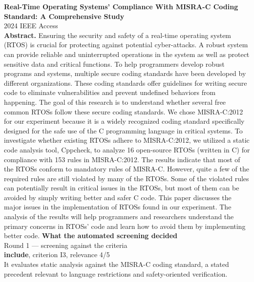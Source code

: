 \documentclass[11pt,a4paper]{article}
\begin{document}
{\large\bfseries Real-Time Operating Systems' Compliance With MISRA-C Coding Standard: A Comprehensive Study}\\[1.5mm]
{\color{soft}\small 2024 \textperiodcentered{} IEEE Access}\\[2mm]
{\small\textbf{Abstract.} Ensuring the security and safety of a real-time operating system (RTOS) is crucial for protecting against potential cyber-attacks. A robust system can provide reliable and uninterrupted operations in the system as well as protect sensitive data and critical functions. To help programmers develop robust programs and systems, multiple secure coding standards have been developed by different organizations. These coding standards offer guidelines for writing secure code to eliminate vulnerabilities and prevent undefined behaviors from happening. The goal of this research is to understand whether several free common RTOSs follow these secure coding standards. We chose MISRA-C:2012 for our experiment because it is a widely recognized coding standard specifically designed for the safe use of the C programming language in critical systems. To investigate whether existing RTOSs adhere to MISRA-C:2012, we utilized a static code analysis tool, Cppcheck, to analyze 16 open-source RTOSs (written in C) for compliance with 153 rules in MISRA-C:2012. The results indicate that most of the RTOSs conform to mandatory rules of MISRA-C. However, quite a few of the required rules are still violated by many of the RTOSs. Some of the violated rules can potentially result in critical issues in the RTOSs, but most of them can be avoided by simply writing better and safer C code. This paper discusses the major issues in the implementation of RTOSs found in our experiment. The analysis of the results will help programmers and researchers understand the primary concerns in RTOSs' code and learn how to avoid them by implementing better code.}
\vspace{3mm}
\vspace{2.5mm}
{\small\textbf{What the automated screening decided}}\\[2mm]
{\footnotesize\color{soft}Round 1 --- screening against the criteria}\\[0.5mm]
{\small\textbf{include}, criterion I3, relevance 4/5}\\[0.5mm]
{\small It evaluates static analysis against the MISRA-C coding standard, a stated precedent relevant to language restrictions and safety-oriented verification.}\\[2.5mm]
\end{document}
